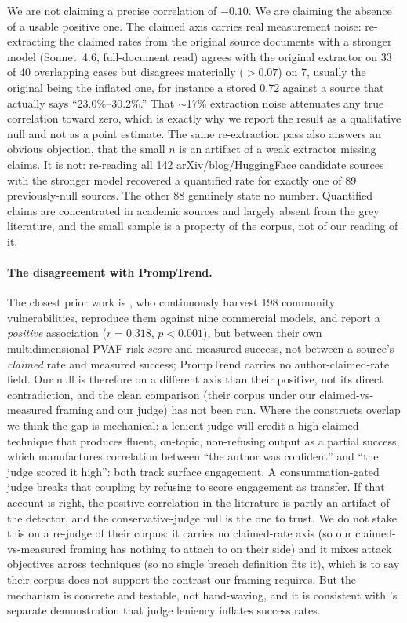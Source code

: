 \documentclass[letterpaper,twocolumn,10pt]{article}
\begin{document}
We are not claiming a precise correlation of $-0.10$. We are claiming the absence of a usable positive one. The claimed axis carries real measurement noise: re-extracting the claimed rates from the original source documents with a stronger model (Sonnet~4.6, full-document read) agrees with the original extractor on 33 of 40 overlapping cases but disagrees materially ($>0.07$) on 7, usually the original being the inflated one, for instance a stored 0.72 against a source that actually says ``23.0\%--30.2\%.'' That $\sim$17\% extraction noise attenuates any true correlation toward zero, which is exactly why we report the result as a qualitative null and not as a point estimate. The same re-extraction pass also answers an obvious objection, that the small $n$ is an artifact of a weak extractor missing claims. It is not: re-reading all 142 arXiv/blog/HuggingFace candidate sources with the stronger model recovered a quantified rate for exactly one of 89 previously-null sources. The other 88 genuinely state no number. Quantified claims are concentrated in academic sources and largely absent from the grey literature, and the small sample is a property of the corpus, not of our reading of it.

\paragraph{The disagreement with PrompTrend.} The closest prior work is \citet{gasmi2025promptrend}, who continuously harvest 198 community vulnerabilities, reproduce them against nine commercial models, and report a \emph{positive} association ($r{=}0.318$, $p<0.001$), but between their own multidimensional PVAF risk \emph{score} and measured success, not between a source's \emph{claimed} rate and measured success; PrompTrend carries no author-claimed-rate field. Our null is therefore on a different axis than their positive, not its direct contradiction, and the clean comparison (their corpus under our claimed-vs-measured framing and our judge) has not been run. Where the constructs overlap we think the gap is mechanical: a lenient judge will credit a high-claimed technique that produces fluent, on-topic, non-refusing output as a partial success, which manufactures correlation between ``the author was confident'' and ``the judge scored it high'': both track surface engagement. A consummation-gated judge breaks that coupling by refusing to score engagement as transfer. If that account is right, the positive correlation in the literature is partly an artifact of the detector, and the conservative-judge null is the one to trust. We do not stake this on a re-judge of their corpus: it carries no claimed-rate axis (so our claimed-vs-measured framing has nothing to attach to on their side) and it mixes attack objectives across techniques (so no single breach definition fits it), which is to say their corpus does not support the contrast our framing requires. But the mechanism is concrete and testable, not hand-waving, and it is consistent with \citet{souly2024strongreject}'s separate demonstration that judge leniency inflates success rates.
\end{document}
